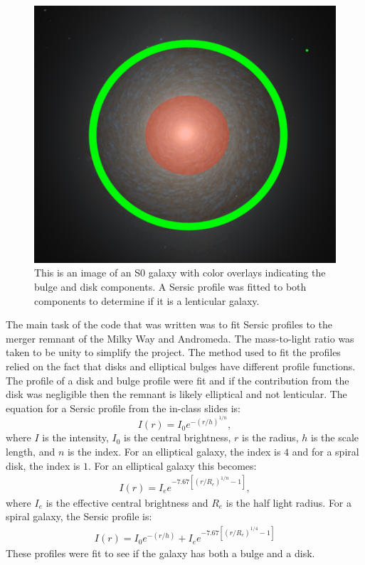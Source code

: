 \documentclass[fleqn,usenatbib]{mnras}
\begin{document}
 \begin{figure}
     \centering
     \includegraphics[scale=0.35]{Figures/NGC1387_-_hst_10217R850GB475.png}
     \caption{This is an image of an S0 galaxy with color overlays indicating the bulge and disk components. A Sersic profile was fitted to both components to determine if it is a lenticular galaxy.}
     \label{fig_2}
 \end{figure}

 The main task of the code that was written was to fit Sersic profiles to the merger remnant of the Milky Way and Andromeda. The mass-to-light ratio was taken to be unity to simplify the project. The method used to fit the profiles relied on the fact that disks and elliptical bulges have different profile functions. The profile of a disk and bulge profile were fit and if the contribution from the disk was negligible then the remnant is likely elliptical and not lenticular. The equation for a Sersic profile from the in-class slides is:
 \begin{equation}
     I(r) = I_0e^{-(r/h)^{1/n}},
 \end{equation}
 where $I$ is the intensity, $I_0$ is the central brightness, $r$ is the radius, $h$ is the scale length, and $n$ is the index. For an elliptical galaxy, the index is $4$ and for a spiral disk, the index is $1$. 
 For an elliptical galaxy this becomes:
 \begin{align}
     I(r) = I_ee^{-7.67[(r/R_e)^{1/n}-1]},
 \end{align}
 where $I_e$ is the effective central brightness and $R_e$ is the half light radius. For a spiral galaxy, the Sersic profile is:
 \begin{align}
     I(r) = I_0e^{-(r/h)}+I_ee^{-7.67[(r/R_e)^{1/4}-1]}
 \end{align}
 These profiles were fit to see if the galaxy has both a bulge and a disk.
\end{document}
